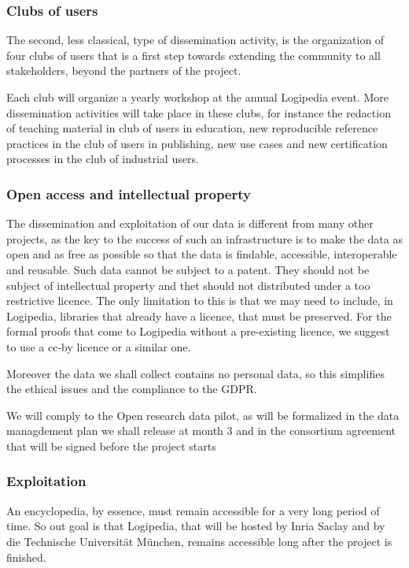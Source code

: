 \subsubsection*{Clubs of users}

The second, less classical, type of dissemination activity, is the
organization of four clubs of users that is a first step towards
extending the community to all stakeholders, beyond the partners of
the project.

Each club will organize a yearly workshop at the annual Logipedia
event. More dissemination activities will take place in these clubs,
for instance the redaction of teaching material in club of users in
education, new reproducible reference practices in the club of users
in publishing, new use cases and new certification processes in the
club of industrial users.

\subsubsection*{Open access and intellectual property}

The dissemination and exploitation of our data is different from many
other projects, as the key to the success of such an infrastructure is
to make the data as open and as free as possible so that the data is
findable, accessible, interoperable and reusable. Such data cannot be
subject to a patent. They should not be subject of intellectual
property and thet should not distributed under a too restrictive
licence.  The only limitation to this is that we may need to include,
in Logipedia, libraries that already have a licence, that must be
preserved.  For the formal proofs that come to Logipedia without a
pre-existing licence, we suggest to use a cc-by licence or a similar
one.

Moreover the data we shall collect contains no personal data, so this
simplifies the ethical issues and the compliance to the GDPR.

We will comply to the Open research data pilot, as will be formalized
in the data managdement plan we shall release at month 3 and in the
consortium agreement that will be signed before the project starts

\subsubsection*{Exploitation}

An encyclopedia, by essence, must remain accessible for a very long
period of time. So out goal is that Logipedia, that will be hosted by
Inria Saclay and by die Technische Universität München, remains
accessible long after the project is finished. 

